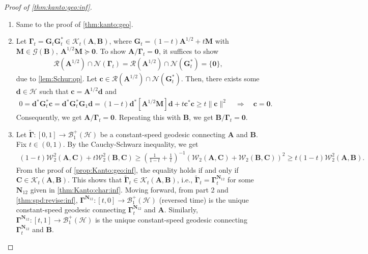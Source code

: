 \documentclass[noinfoline]{imsart}\setcounter{tocdepth}{2}
\newcommand{\m}[1]{\mathbf{#1}} %
\newcommand{\s}[1]{\mathscr{#1}} %
\renewcommand{\c}[1]{\mathcal{#1}} %
\theoremstyle{plain}
\begin{document}
\begin{proof}[Proof of \cref{thm:kanto:geo:inf}] \quad
\begin{enumerate}[leftmargin = *]
\item Same to the proof of \cref{thm:kanto:geo}.
\item Let $\m{\Gamma}_{t} = \m{G}_{t} \m{G}_{t}^{*} \in \c{K}_{t}(\m{A}, \m{B})$, where $\m{G}_{t} = (1-t) \m{A}^{1/2} + t \m{M}$ with $\m{M} \in \s{G}(\m{B}), \ \m{A}^{1/2} \m{M} \succeq \m{0}$. To show $\m{A}/\m{\Gamma}_{t} = \m{0}$, it suffices to show
\begin{align*}
    \c{R}(\m{A}^{1/2}) \cap \c{N}(\m{\Gamma}_{t}) = \c{R}(\m{A}^{1/2}) \cap \c{N}(\m{G}_{t}^{*}) = \{ \m{0} \},
\end{align*}
due to \cref{lem:Schur:op}. Let $\m{c} \in \c{R}(\m{A}^{1/2}) \cap \c{N}(\m{G}_{t}^{*})$. Then, there exists some $\m{d} \in \c{H}$ such that $\m{c} = \m{A}^{1/2} \m{d}$ and
\begin{align*}
    0 = \m{d}^{*} \m{G}_{t}^{*} \m{c} = \m{d}^{*} \m{G}_{t}^{*} \m{G}_{1} \m{d} = (1-t) \m{d}^{*} [\m{A}^{1/2} \m{M}] \m{d} + t \m{c}^{*} \m{c} \ge t \|\m{c}\|^{2} \quad \Rightarrow \quad \m{c} = \m{0}.
\end{align*}
Consequently, we get $\m{A}/\m{\Gamma}_{t} = \m{0}$. Repeating this with $\m{B}$, we get $\m{B}/\m{\Gamma}_{t} = \m{0}$.
\item Let $\tilde{\m{\Gamma}}: [0, 1] \to \c{B}_{1}^{+}(\c{H})$ be a constant-speed geodesic connecting $\m{A}$ and $\m{B}$. Fix $t \in (0, 1)$. By the Cauchy-Schwarz inequality, we get
\begin{align*}
    (1-t) \c{W}_{2}^{2}(\m{A}, \m{C}) + t \c{W}_{2}^{2}(\m{B}, \m{C}) \ge 
    \left(\frac{1}{1-t} + \frac{1}{t} \right)^{-1} (\c{W}_{2}(\m{A}, \m{C}) + \c{W}_{2}(\m{B}, \m{C}))^{2} \ge
    t (1-t) \c{W}_{2}^{2}(\m{A}, \m{B}).
\end{align*}
From the proof of \cref{prop:Kanto:geo:inf}, the equality holds if and only if $\m{C} \in \c{K}_{t}(\m{A}, \m{B})$. This shows that $\tilde{\m{\Gamma}}_{t} \in \c{K}_{t}(\m{A}, \m{B})$, i.e., $\tilde{\m{\Gamma}}_{t} = \m{\Gamma}_{t}^{\m{N}_{12}}$ for some $\m{N}_{12}$ given in \cref{thm:Kanto:char:inf}. Moving forward, from part 2 and 
\cref{thm:spd:revise:inf}, $\m{\Gamma}^{\m{N}_{12}}: [t, 0] \to \c{B}_{1}^{+}(\c{H})$ (reversed time) is the unique constant-speed geodesic connecting $\m{\Gamma}_{t}^{\m{N}_{12}}$ and $\m{A}$. Similarly, $\m{\Gamma}^{\m{N}_{12}}: [t, 1] \to \c{B}_{1}^{+}(\c{H})$ is the unique constant-speed geodesic connecting $\m{\Gamma}_{t}^{\m{N}_{12}}$ and $\m{B}$. 
\end{enumerate}
\end{proof}
\end{document}
